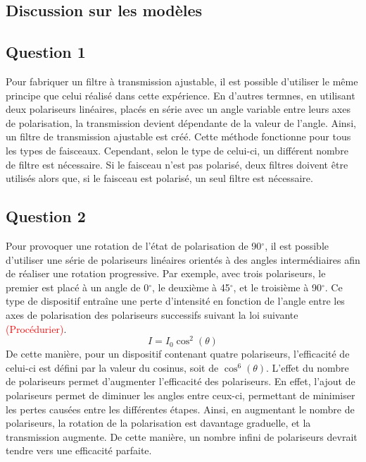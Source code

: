 \documentclass[11pt,letterpaper]{article}
\begin{document}
\subsection{Discussion sur les modèles}

\subsection{Question 1}
Pour fabriquer un filtre à transmission ajustable, il est possible d'utiliser le même principe que celui réalisé dans cette expérience. En d'autres termnes, en utilisant deux polariseurs linéaires, placés en série avec un angle variable entre leurs axes de polarisation, la transmission devient dépendante de la valeur de l'angle. Ainsi, un filtre de transmission ajustable est créé. Cette méthode fonctionne pour tous les types de faisceaux. Cependant, selon le type de celui-ci, un différent nombre de filtre est nécessaire. Si le faisceau n'est pas polarisé, deux filtres doivent être utilisés alors que, si le faisceau est polarisé, un seul filtre est nécessaire.

\subsection{Question 2}
Pour provoquer une rotation de l'état de polarisation de 90$^\circ$, il est possible d'utiliser une série de polariseurs linéaires orientés à des angles intermédiaires afin de réaliser une rotation progressive. Par exemple, avec trois polariseurs, le premier est placé à un angle de 0$^\circ$, le deuxième à 45$^\circ$, et le troisième à 90$^\circ$. Ce type de dispositif entraîne une perte d'intensité en fonction de l'angle entre les axes de polarisation des polariseurs successifs suivant la loi suivante \textcolor{red}{(Procédurier)}.
\begin{equation}
  I=I_{0}\cos^{2}(\theta)
\end{equation}
De cette manière, pour un dispositif contenant quatre polariseurs, l'efficacité de celui-ci est défini par la valeur du cosinus, soit de $\cos^{6}(\theta)$. L'effet du nombre de polariseurs permet d'augmenter l'efficacité des polariseurs. En effet, l'ajout de polariseurs permet de diminuer les angles entre ceux-ci, permettant de minimiser les pertes causées entre les différentes étapes. Ainsi, en augmentant le nombre de polariseurs, la rotation de la polarisation est davantage graduelle, et la transmission augmente. De cette manière, un nombre infini de polariseurs devrait tendre vers une efficacité parfaite.
\end{document}
